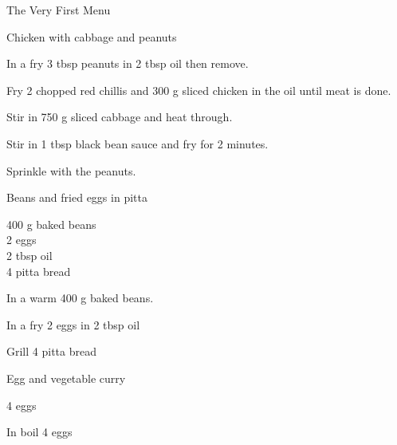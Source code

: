 \begin{menu}{The Very First Menu}
\begin{recipe}{2}{Chicken with cabbage and peanuts}
    \begin{instructions}
    \item \item 
				In a 	fry
				3 tbsp  peanuts
				in
				2 tbsp  oil
				then remove.
			\item 
				Fry 2  chopped red chillis
				and
				300 g sliced chicken
				in the oil until meat is done.
			\item 
				Stir in
				750 g sliced cabbage
				and heat through.
			\item 
				Stir in 
				1 tbsp  black bean sauce
				and fry for 2 minutes.
			\item 
				Sprinkle with the peanuts.
			
    \end{instructions}
    \end{recipe}%
  
    \begin{recipe}{1}{Beans and fried eggs in pitta}%
    
		\begin{ingredients}
		400 g baked beans  \\
	2  eggs  \\
	2 tbsp oil  \\
	4  pitta bread  \\
	
		\end{ingredients}
	
    \begin{instructions}
    \item 
				In a  warm
				400 g  baked beans.
			\item 
				In a  fry
				2   eggs
				in 
				2 tbsp  oil\item 
				Grill
				4   pitta bread
    \end{instructions}
    \end{recipe}%
  
    \begin{recipe}{2}{Egg and vegetable curry}%
    
		\begin{ingredients}
		4  eggs  \\
	
		\end{ingredients}
	
    \begin{instructions}
    \item 
				In  boil
				4   eggs\item 
    \end{instructions}
    \end{recipe}%
  
    \clearpage
    \end{menu}
	
